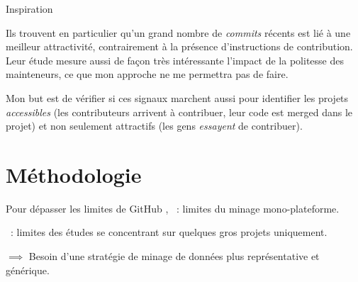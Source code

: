 \documentclass[usenames,dvipsnames,10pt]{beamer}
\newcommand{\mycite}[1]{%
    \citeauthor{#1} \citeyear{#1} \cite{#1}%
}
\begin{document}
\begin{frame}[fragile]{Inspiration}
{        Ils trouvent en particulier qu'un grand nombre de \emph{commits} récents
        est lié à une meilleur attractivité, contrairement à la présence
        d'instructions de contribution. Leur étude mesure aussi de façon très
        intéressante l'impact de la politesse des mainteneurs, ce que mon
        approche ne me permettra pas de faire.

        Mon but est de vérifier si ces signaux marchent aussi pour identifier
        les projets \emph{accessibles} (les contributeurs arrivent à contribuer,
        leur code est merged dans le projet) et non seulement attractifs (les
        gens \emph{essayent} de contribuer).
    }
\end{frame}

\section{Méthodologie}

\begin{frame}[fragile]{Pour dépasser les limites de GitHub}
    \mycite{mining-github-2014}, \mycite{penumbra-oss-2022} : limites du minage
    mono-plateforme.

    \mycite{barriers-2018} : limites des études se concentrant sur quelques gros
    projets uniquement.

    \bigskip

    $\implies$ Besoin d'une stratégie de minage de données plus représentative
    et générique.

    \begin{figure}
        
    \end{figure}

\end{frame}
\end{document}
